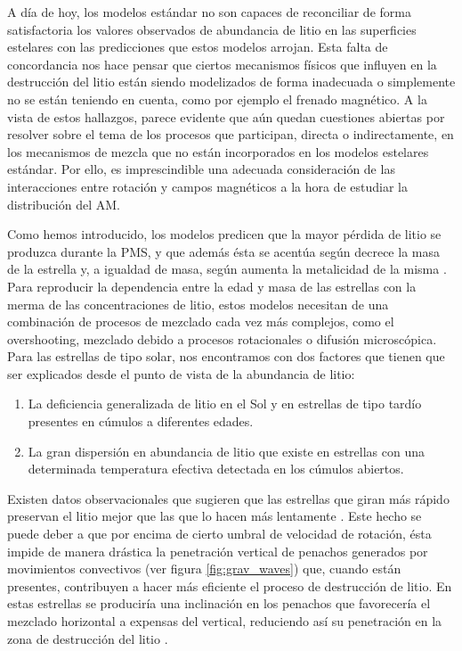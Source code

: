 A día de hoy, los modelos estándar no son capaces de reconciliar de forma satisfactoria los valores observados de abundancia de litio en las superficies estelares con las predicciones que estos modelos arrojan. Esta falta de concordancia nos hace pensar que ciertos mecanismos físicos que influyen en la destrucción del litio están siendo modelizados de forma inadecuada o simplemente no se están teniendo en cuenta, como por ejemplo el frenado magnético. A la vista de estos hallazgos, parece evidente que aún quedan cuestiones abiertas por resolver sobre el tema de los procesos que participan, directa o indirectamente, en los mecanismos de mezcla que no están incorporados en los modelos estelares estándar. Por ello, es imprescindible una adecuada consideración de las interacciones entre rotación y campos magnéticos a la hora de estudiar la distribución del AM. \par

Como hemos introducido, los modelos predicen que la mayor pérdida de litio se produzca durante la PMS, y que además ésta se acentúa según decrece la masa de la estrella y, a igualdad de masa, según aumenta la metalicidad de la misma \citep{Jeffries2014}. Para reproducir la dependencia entre la edad y masa de las estrellas con la merma de las concentraciones de litio, estos modelos necesitan de una combinación de procesos de mezclado cada vez más complejos, como el overshooting, mezclado debido a procesos rotacionales o difusión microscópica. Para las estrellas de tipo solar, nos encontramos con dos factores que tienen que ser explicados desde el punto de vista de la abundancia de litio:

\begin{enumerate}
    \item La deficiencia generalizada de litio en el Sol y en estrellas de tipo tardío presentes en cúmulos a diferentes edades.
    \item La gran dispersión en abundancia de litio que existe en estrellas con una determinada temperatura efectiva detectada en los cúmulos abiertos.
\end{enumerate}

Existen datos observacionales que sugieren que las estrellas que giran más rápido preservan el litio mejor que las que lo hacen más lentamente \citep{Eggenberger2009}. Este hecho se puede deber a que por encima de cierto umbral de velocidad de rotación, ésta impide de manera drástica la penetración vertical de penachos generados por movimientos convectivos (ver figura \ref{fig:grav_waves}) que, cuando están presentes, contribuyen a hacer más eficiente el proceso de destrucción de litio. En estas estrellas se produciría una inclinación en los penachos que favorecería el mezclado horizontal a expensas del vertical, reduciendo así su penetración en la zona de destrucción del litio \citep{Baraffe2017}.\par

